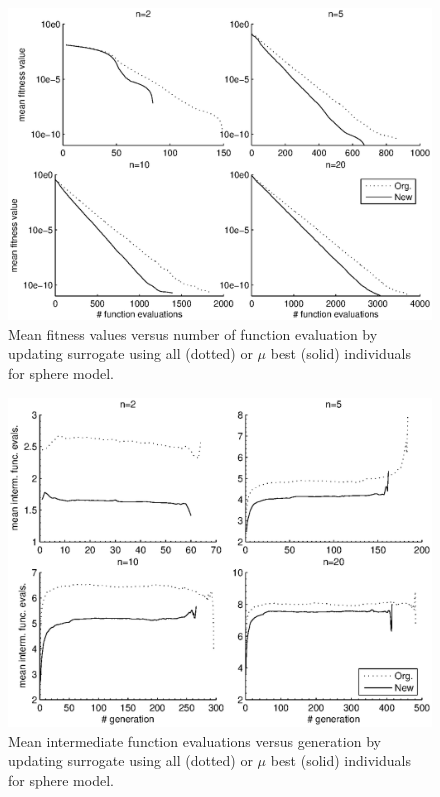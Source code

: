 \documentclass[10pt, conference]{IEEEtran} %
\begin{document}
\begin{figure}[b!]
\centering
\includegraphics[trim = 8mm 10mm 10mm 5mm, clip, width=0.8\columnwidth]{sphere_meanFitness_funcEval}
\caption{Mean fitness values versus number of function evaluation by updating surrogate using all (dotted) or $\mu$ best (solid) individuals for sphere model.}
\label{fig:sphereFitness}
\end{figure}
\begin{figure}[t!]
\centering
\includegraphics[trim = 10mm 10mm 10mm 5mm, clip, width=0.8\columnwidth]{sphere_intmEvals_gen}
\caption{Mean intermediate function evaluations versus generation by updating surrogate using all (dotted) or  $\mu$ best (solid) individuals for sphere model.}
\label{fig:sphereIntmEval}
\end{figure}
\end{document}
